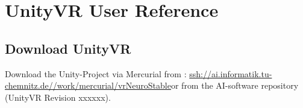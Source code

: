 \documentclass[10pt,final]{scrreprt}
\newcommand{\unityvrrepos}{\url{ssh://ai.informatik.tu-chemnitz.de//work/mercurial/vrNeuroStable}}
\begin{document}

\chapter{UnityVR User Reference}
\label{basicsofunityvr}


\section{Download UnityVR}

 Download the Unity-Project via Mercurial from : \unityvrrepos  or from the AI-software repository (UnityVR Revision xxxxxx).
\end{document}
